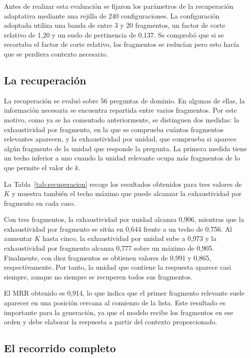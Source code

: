 Antes de realizar esta evaluación se fijaron los
parámetros de la recuperación adaptativa mediante una rejilla de 240
configuraciones. La configuración adoptada utiliza una banda de entre 3 y 20
fragmentos, un factor de corte relativo de 1,20 y un suelo de pertinencia de
0,137. Se comprobó que si se recortaba el factor de corte relativo, los fragmentos se reducían pero esto hacía que se perdiera contexto necesario.


\subsection{La recuperación}
\label{secc:resultados_rag_recuperacion}

La recuperación se evaluó sobre 56 preguntas de dominio. En algunas de ellas, la información necesaria se encuentra repartida entre varios fragmentos. Por este motivo, como ya se ha comentado anteriormente, se distinguen dos medidas: la exhaustividad por fragmento, en la que se comprueba cuántos fragmentos relevantes aparecen, y la exhaustividad por unidad, que comprueba si aparece algún fragmento de la unidad que responde la pregunta. La primera medida tiene un techo inferior a uno cuando la unidad relevante ocupa más fragmentos de lo que permite el valor de $k$.


La Tabla~\ref{tab:recuperacion} recoge los resultados
obtenidos para tres valores de $K$ y muestra también el techo máximo que puede
alcanzar la exhaustividad por fragmento en cada caso.




Con tres fragmentos, la exhaustividad por unidad alcanza
0,906, mientras que la exhaustividad por fragmento se sitúa en 0,644 frente a
un techo de 0,756. Al aumentar $K$ hasta cinco, la exhaustividad por unidad
sube a 0,973 y la exhaustividad por fragmento alcanza 0,777 sobre un máximo de
0,905. Finalmente, con diez fragmentos se obtienen valores de 0,991 y 0,865,
respectivamente. Por tanto, la unidad que contiene la respuesta aparece casi
siempre, aunque no siempre se recuperen todos sus fragmentos.


El MRR obtenido es 0,914, lo que indica que el primer
fragmento relevante suele aparecer en una posición cercana al comienzo de la
lista. Este resultado es importante para la generación, ya que el modelo
recibe los fragmentos en ese orden y debe elaborar la respuesta a partir del
contexto proporcionado.


\subsection{El recorrido completo}
\label{secc:resultados_rag_sistema}

